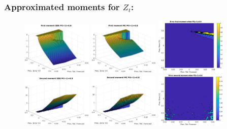 \documentclass[aspectratio=169]{beamer}\usepackage[utf8]{inputenc}
\begin{document}
\begin{frame}\frametitle{Approximated moments for $Z_t$:}

\begin{figure}[ht!]
\centering
\includegraphics[width=0.3\textwidth]{../../MATLAB_Files/Results/moments/lamperti/errors/fm_ODE_7.eps}\quad
\includegraphics[width=0.3\textwidth]{../../MATLAB_Files/Results/moments/lamperti/errors/fm_MC_7.eps}\quad
\includegraphics[width=0.3\textwidth]{../../MATLAB_Files/Results/moments/lamperti/errors/fm_7.eps}\quad
\includegraphics[width=0.3\textwidth]{../../MATLAB_Files/Results/moments/lamperti/errors/sm_ODE_7.eps}\quad
\includegraphics[width=0.3\textwidth]{../../MATLAB_Files/Results/moments/lamperti/errors/sm_MC_7.eps}\quad
\includegraphics[width=0.3\textwidth]{../../MATLAB_Files/Results/moments/lamperti/errors/sm_7.eps}
\end{figure}

\end{frame}
\end{document}
